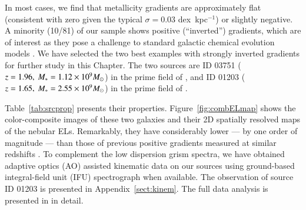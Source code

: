 In most cases, we find that metallicity gradients are approximately flat (\ie consistent with zero given the typical
$\sigma=0.03$ dex~kpc$^{-1}$) or slightly negative. A minority (10/81) of our sample shows positive (\ie ``inverted'') gradients,
which are of interest as they pose a challenge to standard galactic chemical evolution models 
\citep[\eg,][]{Molla:2005eq,Molla:2018em}.
We have selected the two best examples with strongly inverted gradients for further study in this Chapter.
The two sources are ID 03751 ($z=1.96,~M_\ast=1.12\times10^9M_\odot$) in the prime field of \clsan, and ID 01203
($z=1.65,~M_\ast=2.55\times10^9M_\odot$) in the prime field of \clba.

Table~\ref{tab:srcprop} presents their properties.
Figure~\ref{fig:combELmap} shows the color-composite \hst images of these two galaxies and their 2D spatially
resolved maps of the nebular ELs.
Remarkably, they have \Mstar considerably lower --- by one order of magnitude --- than those of previous positive gradients 
measured at similar redshifts \citep[see \eg,][]{Cresci:2010hr,Queyrel:2012hw,2014MNRAS.443.2695S,Metallicityevolutio:2014kg}.
To complement the low dispersion grism spectra, we have obtained adaptive optics (AO) assisted kinematic data on our sources using 
ground-based integral-field unit (IFU) spectrograph when available.
The observation of source ID 01203 is presented in Appendix~\ref{sect:kinem}.
The full data analysis is presented in \citet{Hirtenstein:2018tn} in detail.




